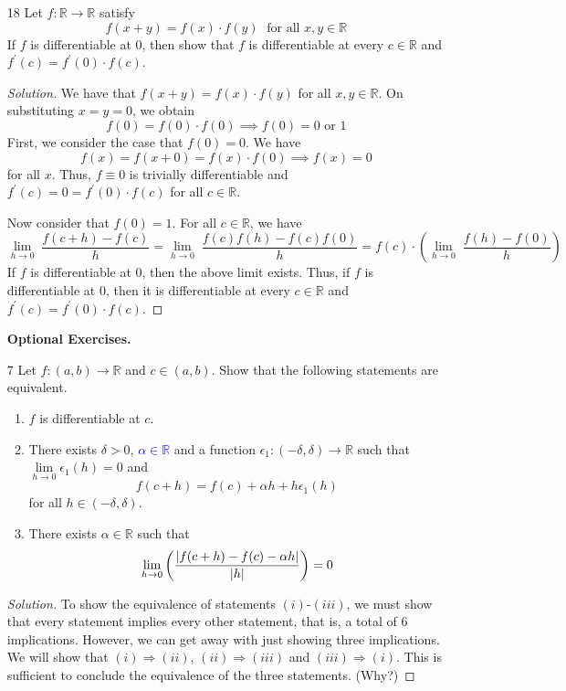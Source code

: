 \documentclass[12pt]{article}
\theoremstyle{definition}
\newenvironment{soln}{\begin{proof}[Solution]}{\end{proof}}
\begin{document}
\begin{enumerate}[leftmargin=*]
    \item[18] Let $f \colon \mathbb{R} \rightarrow \mathbb{R}$ satisfy
    \[
        f(x+y) = f(x) \cdot f(y)  \; \text{ for all } x,y \in \mathbb{R}
    \]
    If $f$ is differentiable at $0$, then show that $f$ is differentiable at every $c \in \mathbb{R}$ and $f^{\prime}(c) = f^{\prime}(0) \cdot f(c)$.
    \begin{soln}
        We have that $f(x+y) = f(x) \cdot f(y)$ for all $x,y \in \mathbb{R}$. On substituting $x=y=0$, we obtain 
        \[
            f(0) = f(0) \cdot f(0) \implies f(0) = 0 \text{ or } 1
        \]
        First, we consider the case that $f(0)=0$. We have
        \[
            f(x) = f(x+0) = f(x) \cdot f(0) \implies f(x) = 0
        \]
        for all $x$. Thus, $f \equiv 0$ is trivially differentiable and $f^{\prime}(c) = 0 = f^{\prime}(0) \cdot f(c)$ for all $c \in \mathbb{R}$. 
        \medskip
        
        Now consider that $f(0) = 1$. For all $c \in \mathbb{R}$, we have
        \[
            \lim_{h \to 0} \; \frac{f(c+h) - f(c)}{h} = \lim_{h \to 0} \; \frac{f(c)f(h) - f(c) f(0)}{h} = f(c) \cdot \left( \lim_{h \to 0} \; \frac{f(h) - f(0)}{h} \right)
        \]
        If $f$ is differentiable at $0$, then the above limit exists. Thus, if $f$ is differentiable at $0$, then it is differentiable at every $c \in \mathbb{R}$ and $f^{\prime}(c) = f^{\prime}(0) \cdot f(c)$.
    \end{soln}
    
    \newpage
    
    \textbf{Optional Exercises.}
    
    \item[7] Let $f \colon (a,b) \rightarrow \mathbb{R}$ and $c \in (a,b)$. Show that the following statements are equivalent. 
    \begin{enumerate}[label = (\roman*)]
        \item $f$ is differentiable at $c$.
        \item There exists $\delta>0$, \textcolor{blue}{$\alpha \in \mathbb{R}$} and a function $\epsilon_1 \colon (-\delta, \delta) \rightarrow \mathbb{R}$ such that $\lim\limits_{h \to 0} \epsilon_1(h) = 0$ and
        \[
            f(c+h) = f(c) + \alpha h + h \epsilon_1(h)
        \]
        for all $h \in (-\delta, \delta)$.
        \item There exists $\alpha \in \mathbb{R}$ such that
        \[
            \lim_{h \to 0} \left( \frac{\abs{f(c+h) - f(c) - \alpha h}}{\abs{h}} \right) = 0
        \]
    \end{enumerate}
    \begin{soln}
        To show the equivalence of statements $(i)$-$(iii)$, we must show that every statement implies every other statement, that is, a total of $6$ implications. However, we can get away with just showing three implications. We will show that $(i) \Rightarrow (ii)$, $(ii) \Rightarrow (iii)$ and $(iii) \Rightarrow (i)$. This is sufficient to conclude the equivalence of the three statements. (Why?)
        \medskip
        

\end{soln}
\end{enumerate}
\end{document}
